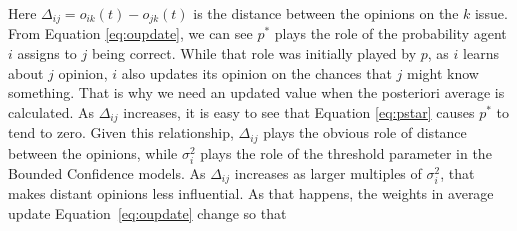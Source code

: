 \documentclass{article}
\begin{document}
Here \(\Delta_{ij} = o_{ik} (t) - o_{jk} (t)\) is the distance between the
opinions on the $k$ issue. From Equation \ref{eq:oupdate}, we can see $p^{*}$ plays the role of the
probability agent $i$ assigns to $j$ being correct. While that role was initially played by $p$, as $i$ learns
about $j$ opinion, $i$ also updates its opinion on the chances that $j$ might know something. That is why
we need an updated value when the posteriori average is calculated.
As $\Delta_{ij}$ increases, it is easy to see that
Equation \ref{eq:pstar} causes $p^{*}$ to tend to zero. Given this relationship,
$\Delta_{ij}$ plays the obvious role of distance between the opinions, while $\sigma_i^2$ plays the role of the threshold parameter in the Bounded
Confidence models. As $\Delta_{ij}$ increases as larger multiples of $\sigma_i^2$, that makes distant opinions less influential. As that
happens, the weights in average update Equation~\ref{eq:oupdate} change so that
\end{document}
